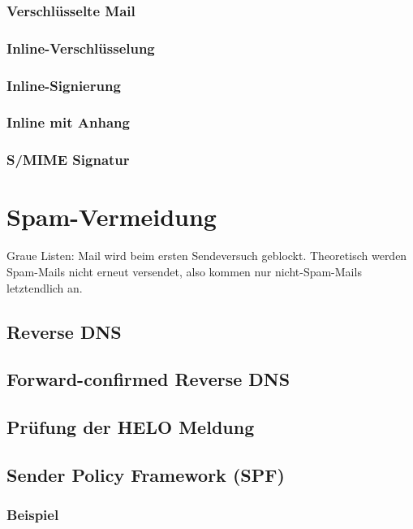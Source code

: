 \subsubsection*{Verschlüsselte Mail}
\subsubsection*{Inline-Verschlüsselung}
\subsubsection*{Inline-Signierung}
\subsubsection*{Inline mit Anhang}
\subsubsection*{S/MIME Signatur}

\section{Spam-Vermeidung}
Graue Listen: Mail wird beim ersten Sendeversuch geblockt. Theoretisch werden Spam-Mails nicht erneut versendet, also kommen nur nicht-Spam-Mails letztendlich an.

\subsection{Reverse DNS}
\subsection{Forward-confirmed Reverse DNS}
\subsection{Prüfung der HELO Meldung}
\subsection{Sender Policy Framework (SPF)}
\subsubsection{Beispiel}
